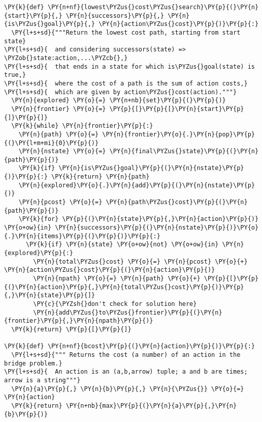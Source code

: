 \begin{Verbatim}[commandchars=\\\{\}]
\PY{k}{def} \PY{n+nf}{lowest\PYZus{}cost\PYZus{}search}\PY{p}{(}\PY{n}{start}\PY{p}{,} \PY{n}{successors}\PY{p}{,} \PY{n}{is\PYZus{}goal}\PY{p}{,} \PY{n}{action\PYZus{}cost}\PY{p}{)}\PY{p}{:}
  \PY{l+s+sd}{"""Return the lowest cost path, starting from start state}
\PY{l+s+sd}{  and considering successors(state) => \PYZob{}state:action,...\PYZcb{},}
\PY{l+s+sd}{  that ends in a state for which is\PYZus{}goal(state) is true,}
\PY{l+s+sd}{  where the cost of a path is the sum of action costs,}
\PY{l+s+sd}{  which are given by action\PYZus{}cost(action)."""}
  \PY{n}{explored} \PY{o}{=} \PY{n+nb}{set}\PY{p}{(}\PY{p}{)}
  \PY{n}{frontier} \PY{o}{=} \PY{p}{[}\PY{p}{[}\PY{n}{start}\PY{p}{]}\PY{p}{]}
  \PY{k}{while} \PY{n}{frontier}\PY{p}{:}
    \PY{n}{path} \PY{o}{=} \PY{n}{frontier}\PY{o}{.}\PY{n}{pop}\PY{p}{(}\PY{l+m+mi}{0}\PY{p}{)}
    \PY{n}{nstate} \PY{o}{=} \PY{n}{final\PYZus{}state}\PY{p}{(}\PY{n}{path}\PY{p}{)} 
    \PY{k}{if} \PY{n}{is\PYZus{}goal}\PY{p}{(}\PY{n}{nstate}\PY{p}{)}\PY{p}{:} \PY{k}{return} \PY{n}{path}
    \PY{n}{explored}\PY{o}{.}\PY{n}{add}\PY{p}{(}\PY{n}{nstate}\PY{p}{)}
    \PY{n}{pcost} \PY{o}{=} \PY{n}{path\PYZus{}cost}\PY{p}{(}\PY{n}{path}\PY{p}{)}
    \PY{k}{for} \PY{p}{(}\PY{n}{state}\PY{p}{,}\PY{n}{action}\PY{p}{)} \PY{o+ow}{in} \PY{n}{successors}\PY{p}{(}\PY{n}{nstate}\PY{p}{)}\PY{o}{.}\PY{n}{items}\PY{p}{(}\PY{p}{)}\PY{p}{:}
      \PY{k}{if} \PY{n}{state} \PY{o+ow}{not} \PY{o+ow}{in} \PY{n}{explored}\PY{p}{:}
        \PY{n}{total\PYZus{}cost} \PY{o}{=} \PY{n}{pcost} \PY{o}{+} \PY{n}{action\PYZus{}cost}\PY{p}{(}\PY{n}{action}\PY{p}{)}
        \PY{n}{npath} \PY{o}{=} \PY{n}{path} \PY{o}{+} \PY{p}{[}\PY{p}{(}\PY{n}{action}\PY{p}{,}\PY{n}{total\PYZus{}cost}\PY{p}{)}\PY{p}{,}\PY{n}{state}\PY{p}{]}
        \PY{c}{\PYZsh{}don't check for solution here}
        \PY{n}{add\PYZus{}to\PYZus{}frontier}\PY{p}{(}\PY{n}{frontier}\PY{p}{,}\PY{n}{npath}\PY{p}{)}
  \PY{k}{return} \PY{p}{[}\PY{p}{]} 

\PY{k}{def} \PY{n+nf}{bcost}\PY{p}{(}\PY{n}{action}\PY{p}{)}\PY{p}{:}
  \PY{l+s+sd}{""" Returns the cost (a number) of an action in the bridge problem.}
\PY{l+s+sd}{  An action is an (a,b,arrow) tuple; a and b are times; arrow is a string"""}
  \PY{n}{a}\PY{p}{,} \PY{n}{b}\PY{p}{,} \PY{n}{\PYZus{}} \PY{o}{=} \PY{n}{action}
  \PY{k}{return} \PY{n+nb}{max}\PY{p}{(}\PY{n}{a}\PY{p}{,}\PY{n}{b}\PY{p}{)} 


\end{Verbatim}
